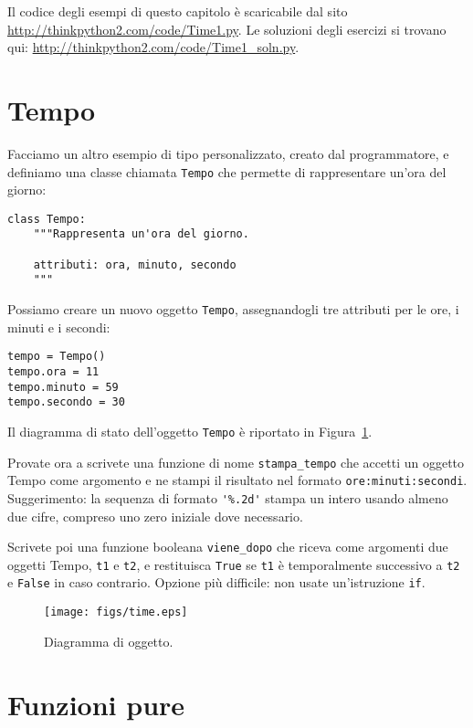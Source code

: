 \documentclass[10pt]{book}
\begin{document}
Il codice degli esempi di questo capitolo è scaricabile dal sito
\url{http://thinkpython2.com/code/Time1.py}.
Le soluzioni degli esercizi si trovano qui:
\url{http://thinkpython2.com/code/Time1_soln.py}.

\section{Tempo}
\label{isafter}

Facciamo un altro esempio di tipo personalizzato, creato dal programmatore, e definiamo una classe chiamata {\tt Tempo} che permette di rappresentare un'ora del giorno:

\begin{verbatim}
class Tempo:
    """Rappresenta un'ora del giorno.
       
    attributi: ora, minuto, secondo
    """
\end{verbatim}
%
Possiamo creare un nuovo oggetto {\tt Tempo}, assegnandogli tre attributi per le
ore, i minuti e i secondi:

\begin{verbatim}
tempo = Tempo()
tempo.ora = 11
tempo.minuto = 59
tempo.secondo = 30
\end{verbatim}
%
Il diagramma di stato dell'oggetto {\tt Tempo} è riportato in Figura~\ref{fig.time}.

Provate ora a scrivete una funzione di nome \verb"stampa_tempo" che accetti un oggetto Tempo come argomento e ne stampi il risultato nel formato {\tt ore:minuti:secondi}.
Suggerimento: la sequenza di formato \verb"'%.2d'" stampa un intero usando almeno due cifre, compreso uno zero iniziale dove necessario.

Scrivete poi una funzione booleana \verb"viene_dopo" che riceva come argomenti due oggetti Tempo, {\tt t1} e {\tt t2}, e restituisca {\tt True} se {\tt t1} è temporalmente successivo a {\tt t2} e {\tt False} in caso contrario.  Opzione più difficile: non usate un'istruzione {\tt if}.


\begin{figure}
\centerline
{\texttt{[image: figs/time.eps]}}
\caption{Diagramma di oggetto.}
\label{fig.time}
\end{figure}


\section{Funzioni pure}
\end{document}
